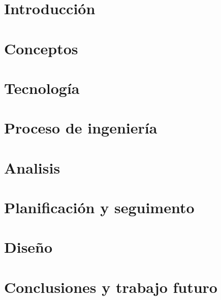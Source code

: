 \documentclass[11pt,a4paper,titlepage,twoside,openright]{report}
\begin{document}
\makeatletter
\def\cleardoublepage{\clearpage\if@twoside \ifodd\c@page\else
  \hbox{}\thispagestyle{empty}\newpage\if@twocolumn\hbox{}\newpage\fi\fi\fi}
\makeatother

\tableofcontents


\chapter{Introducción}
        \label{intro}
        
        \cleardoublepage

\chapter{Conceptos}
        \label{concept}
        
        \cleardoublepage

\chapter{Tecnología}
        \label{tec}
        
        \cleardoublepage

\chapter{Proceso de ingeniería}
		\label{ing}
		
		\cleardoublepage

\chapter{Analisis}
		
		\cleardoublepage


\chapter{Planificación y seguimento}

\cleardoublepage



\chapter{Diseño}
		
 		\cleardoublepage



\chapter{Conclusiones y trabajo futuro}
        
        \cleardoublepage
\end{document}
